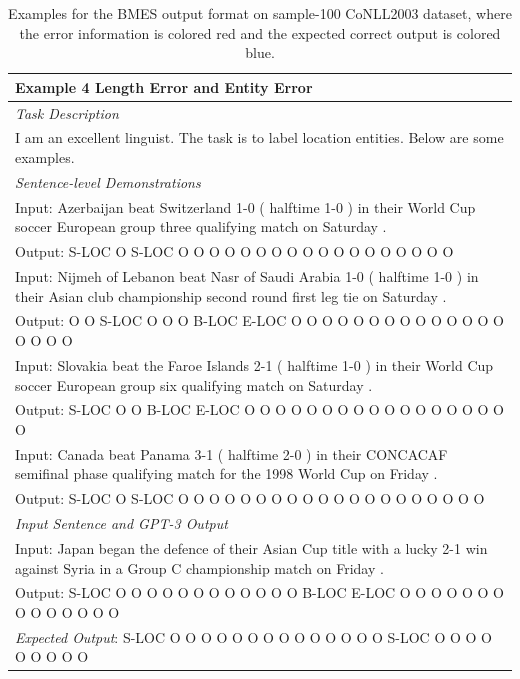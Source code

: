 \documentclass[11pt]{article}
\begin{document}
\begin{table}[th!]
{\begin{tabular}{l}
\textbf{Example 4 {\color{red} Length Error and Entity Error}} \\\midrule
\textit{Task Description} \\
I am an excellent linguist. The task is to label location entities. Below are some examples. \\\midrule
\textit{Sentence-level Demonstrations} \\
Input: Azerbaijan beat Switzerland 1-0 ( halftime 1-0 ) in their World Cup soccer European group three qualifying match on Saturday . \\
Output: S-LOC O S-LOC O O O O O O O O O O O O O O O O O O \\
Input: Nijmeh of Lebanon beat Nasr of Saudi Arabia 1-0 ( halftime 1-0 ) in their Asian club championship second round first leg tie on Saturday . \\
Output: O O S-LOC O O O B-LOC E-LOC O O O O O O O O O O O O O O O O O O \\
Input: Slovakia beat the Faroe Islands 2-1 ( halftime 1-0 ) in their World Cup soccer European group six qualifying match on Saturday . \\
Output: S-LOC O O B-LOC E-LOC O O O O O O O O O O O O O O O O O O \\
Input: Canada beat Panama 3-1 ( halftime 2-0 ) in their CONCACAF semifinal phase qualifying match for the 1998 World Cup on Friday . \\
Output: S-LOC O S-LOC O O O O O O O O O O O O O O O O O O O O \\\midrule
\textit{Input Sentence and GPT-3 Output} \\
Input: Japan began the defence of their Asian Cup title with a lucky 2-1 win against Syria in a Group C championship match on Friday . \\
Output: S-LOC O O O O O O O O O O O O B-LOC E-LOC O O O O O O O O O O O O O O \\
{\color{blue}\it Expected Output}: S-LOC O O O O O O O O O O O O O O S-LOC O O O O O O O O O \\\bottomrule
    \end{tabular}
    }
     \caption{Examples for the BMES output format on sample-100 CoNLL2003 dataset, where the error information is colored red and the expected correct output is colored blue.}
    \label{tab:bmes_format}
\end{table}
\end{document}
